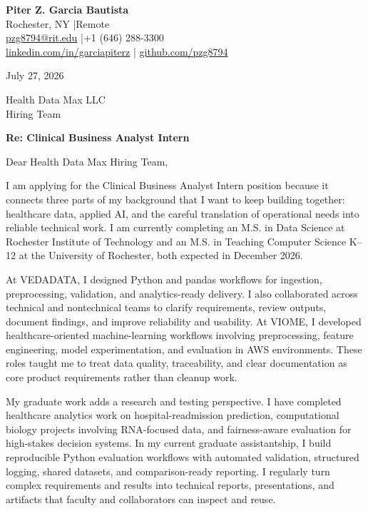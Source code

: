 \documentclass[10pt,letterpaper]{article}
\begin{document}
{\Large\bfseries\color{accent} Piter Z. Garcia Bautista}\\[-1pt]
Rochester, NY \enspace|\enspace Remote\\
\href{mailto:pzg8794@rit.edu}{pzg8794@rit.edu}
\enspace|\enspace +1 (646) 288-3300\\
\href{https://linkedin.com/in/garciapiterz}{linkedin.com/in/garciapiterz}
\enspace|\enspace
\href{https://github.com/pzg8794}{github.com/pzg8794}

\vspace{8pt}
July 27, 2026

Health Data Max LLC\\
Hiring Team

\textbf{Re: Clinical Business Analyst Intern}

Dear Health Data Max Hiring Team,

I am applying for the Clinical Business Analyst Intern position because it
connects three parts of my background that I want to keep building together:
healthcare data, applied AI, and the careful translation of operational needs
into reliable technical work. I am currently completing an M.S. in Data Science
at Rochester Institute of Technology and an M.S. in Teaching Computer Science
K--12 at the University of Rochester, both expected in December 2026.

At VEDADATA, I designed Python and pandas workflows for ingestion,
preprocessing, validation, and analytics-ready delivery. I also collaborated
across technical and nontechnical teams to clarify requirements, review
outputs, document findings, and improve reliability and usability. At VIOME, I
developed healthcare-oriented machine-learning workflows involving
preprocessing, feature engineering, model experimentation, and evaluation in
AWS environments. These roles taught me to treat data quality, traceability,
and clear documentation as core product requirements rather than cleanup work.

My graduate work adds a research and testing perspective. I have completed
healthcare analytics work on hospital-readmission prediction, computational
biology projects involving RNA-focused data, and fairness-aware evaluation for
high-stakes decision systems. In my current graduate assistantship, I build
reproducible Python evaluation workflows with automated validation, structured
logging, shared datasets, and comparison-ready reporting. I regularly turn
complex requirements and results into technical reports, presentations, and
artifacts that faculty and collaborators can inspect and reuse.
\end{document}
